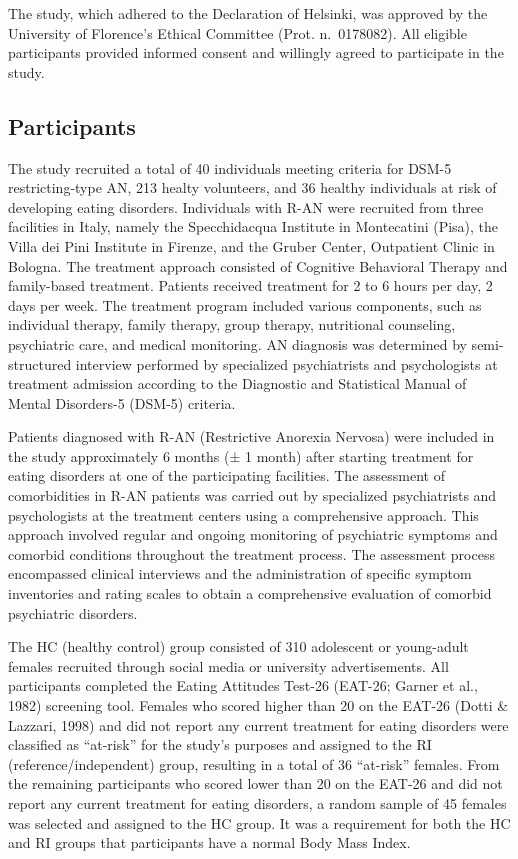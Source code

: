 \documentclass[
  man,floatsintext]{apa6}
\begin{document}
The study, which adhered to the Declaration of Helsinki, was approved by the University of Florence's Ethical Committee (Prot. n.~0178082). All eligible participants provided informed consent and willingly agreed to participate in the study.

\hypertarget{participants}{%
\subsection{Participants}\label{participants}}

The study recruited a total of 40 individuals meeting criteria for DSM-5 restricting-type AN, 213 healty volunteers, and 36 healthy individuals at risk of developing eating disorders. Individuals with R-AN were recruited from three facilities in Italy, namely the Specchidacqua Institute in Montecatini (Pisa), the Villa dei Pini Institute in Firenze, and the Gruber Center, Outpatient Clinic in Bologna. The treatment approach consisted of Cognitive Behavioral Therapy and family-based treatment. Patients received treatment for 2 to 6 hours per day, 2 days per week. The treatment program included various components, such as individual therapy, family therapy, group therapy, nutritional counseling, psychiatric care, and medical monitoring. AN diagnosis was determined by semi-structured interview performed by specialized psychiatrists and psychologists at treatment admission according to the Diagnostic and Statistical Manual of Mental Disorders-5 (DSM-5) criteria.

Patients diagnosed with R-AN (Restrictive Anorexia Nervosa) were included in the study approximately 6 months (± 1 month) after starting treatment for eating disorders at one of the participating facilities. The assessment of comorbidities in R-AN patients was carried out by specialized psychiatrists and psychologists at the treatment centers using a comprehensive approach. This approach involved regular and ongoing monitoring of psychiatric symptoms and comorbid conditions throughout the treatment process. The assessment process encompassed clinical interviews and the administration of specific symptom inventories and rating scales to obtain a comprehensive evaluation of comorbid psychiatric disorders.

The HC (healthy control) group consisted of 310 adolescent or young-adult females recruited through social media or university advertisements. All participants completed the Eating Attitudes Test-26 (EAT-26; Garner et al., 1982) screening tool. Females who scored higher than 20 on the EAT-26 (Dotti \& Lazzari, 1998) and did not report any current treatment for eating disorders were classified as ``at-risk'' for the study's purposes and assigned to the RI (reference/independent) group, resulting in a total of 36 ``at-risk'' females. From the remaining participants who scored lower than 20 on the EAT-26 and did not report any current treatment for eating disorders, a random sample of 45 females was selected and assigned to the HC group. It was a requirement for both the HC and RI groups that participants have a normal Body Mass Index.
\end{document}
